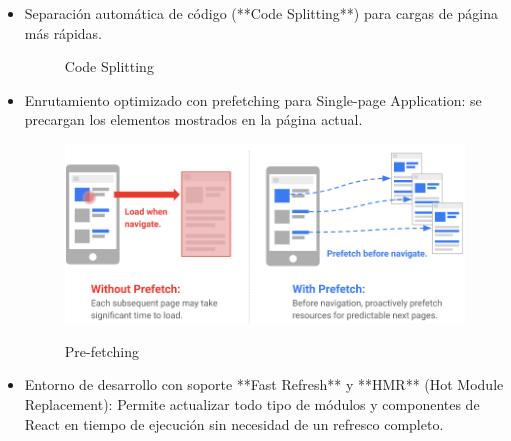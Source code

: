\documentclass[12pt,twoside,titlepage]{report}
\begin{document}
\begin{itemize}
    \item Separación automática de código (**Code Splitting**) para cargas de página más rápidas.
        \begin{figure}[H]
            \centering
            \caption{Code Splitting}
            \label{f:codesplit}
        \end{figure}
    \item Enrutamiento optimizado con prefetching para Single-page Application: se precargan los elementos mostrados en la página actual.
        \begin{figure}[H]
            \centering
            \includegraphics[scale=0.45]{Nextjs/Prefetch}
            \label{fig:nextjs_prefetch}
            \caption{Pre-fetching}
        \end{figure}
    \item Entorno de desarrollo con soporte **Fast Refresh** y **HMR** (Hot Module Replacement): Permite actualizar todo tipo de módulos y componentes de React en tiempo de ejecución sin necesidad de un refresco completo.

\end{itemize}
\end{document}

